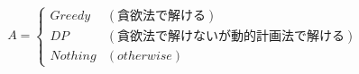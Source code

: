 \documentclass[11pt,a4paper]{jarticle}
\begin{document}
\[
  A = \begin{cases}
    Greedy & (貪欲法で解ける) \\
    DP & (貪欲法で解けないが動的計画法で解ける) \\
    Nothing & (otherwise)
  \end{cases}
\]
\end{document}
